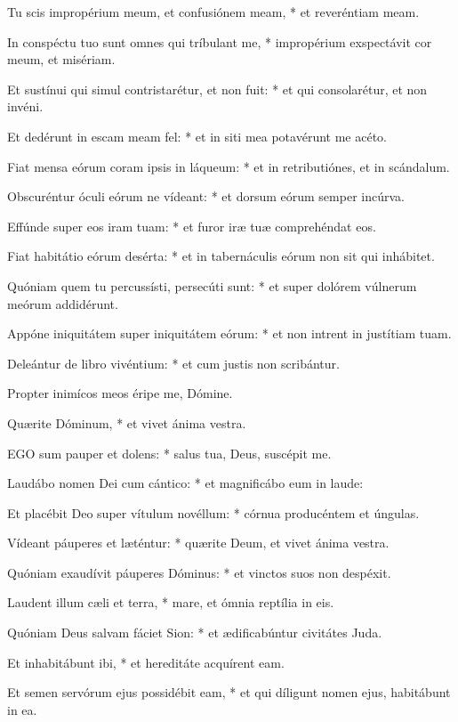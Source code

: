 Tu scis impropérium meum, et confusiónem meam, * et reveréntiam meam.

In conspéctu tuo sunt omnes qui tríbulant me, * impropérium exspectávit cor meum, et misériam.

Et sustínui qui simul contristarétur, et non fuit: * et qui consolarétur, et non invéni.

Et dedérunt in escam meam fel: * et in siti mea potavérunt me acéto.

Fiat mensa eórum coram ipsis in láqueum: * et in retributiónes, et in scándalum.

Obscuréntur óculi eórum ne vídeant: * et dorsum eórum semper incúrva.

Effúnde super eos iram tuam: * et furor iræ tuæ comprehéndat eos.

Fiat habitátio eórum desérta: * et in tabernáculis eórum non sit qui inhábitet.

Quóniam quem tu percussísti, persecúti sunt: * et super dolórem vúlnerum meórum addidérunt.

Appóne iniquitátem super iniquitátem eórum: * et non intrent in justítiam tuam.

Deleántur de libro vivéntium: * et cum justis non scribántur.

 Propter inimícos meos éripe me, Dómine.

 Quærite Dóminum, * et vivet ánima vestra.


\lettrine[lines=2]{E}{GO} sum pauper et dolens: * salus tua, Deus, suscépit me.

Laudábo nomen Dei cum cántico: * et magnificábo eum in laude:

Et placébit Deo super vítulum novéllum: * córnua producéntem et úngulas.

Vídeant páuperes et læténtur: * quærite Deum, et vivet ánima vestra.

Quóniam exaudívit páuperes Dóminus: * et vinctos suos non despéxit.

Laudent illum cæli et terra, * mare, et ómnia reptília in eis.

Quóniam Deus salvam fáciet Sion: * et ædificabúntur civitátes Juda.

Et inhabitábunt ibi, * et hereditáte acquírent eam.

Et semen servórum ejus possidébit eam, * et qui díligunt nomen ejus, habitábunt in ea.


